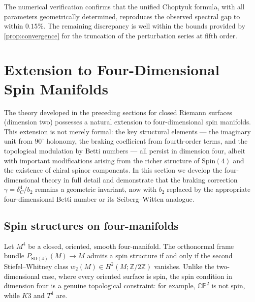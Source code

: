 \documentclass[12pt,a4paper]{article}
\theoremstyle{definition}
\theoremstyle{remark}
\newcommand{\CC}{\mathbb{C}}
\newcommand{\ZZ}{\mathbb{Z}}
\newcommand{\PP}{\mathbb{P}}
\newcommand{\SO}{\mathrm{SO}}
\newcommand{\Spin}{\mathrm{Spin}}
\begin{document}
The numerical verification confirms that the unified Choptyuk formula, with all parameters geometrically determined, reproduces the observed spectral gap to within $0.15\%$. The remaining discrepancy is well within the bounds provided by \cref{prop:convergence} for the truncation of the perturbation series at fifth order.


\section{Extension to Four-Dimensional Spin Manifolds}
\label{sec:4d}

The theory developed in the preceding sections for closed Riemann surfaces (dimension two) possesses a natural extension to four-dimensional spin manifolds. This extension is not merely formal: the key structural elements --- the imaginary unit from $90^\circ$ holonomy, the braking coefficient from fourth-order terms, and the topological modulation by Betti numbers --- all persist in dimension four, albeit with important modifications arising from the richer structure of $\Spin(4)$ and the existence of chiral spinor components. In this section we develop the four-dimensional theory in full detail and demonstrate that the braking correction $\gamma = \delta_C^4/b_2$ remains a geometric invariant, now with $b_2$ replaced by the appropriate four-dimensional Betti number or its Seiberg--Witten analogue.

\subsection{Spin structures on four-manifolds}

Let $M^4$ be a closed, oriented, smooth four-manifold. The orthonormal frame bundle $P_{\SO(4)}(M) \to M$ admits a spin structure if and only if the second Stiefel--Whitney class $w_2(M) \in H^2(M; \ZZ/2\ZZ)$ vanishes. Unlike the two-dimensional case, where every oriented surface is spin, the spin condition in dimension four is a genuine topological constraint: for example, $\CC\PP^2$ is not spin, while $K3$ and $T^4$ are.
\end{document}
